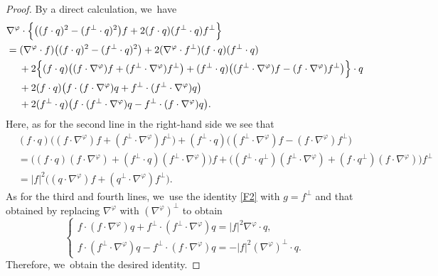 \begin{proof}
By a direct calculation, we~have
\begin{align*}
& \nabla^\varphi\cdot\Bigl\{ \bigl((f\cdot q)^2-(f^\perp\cdot q)^2 \bigr)f + 2(f\cdot q)(f^\perp\cdot q)f^\perp \Bigr\} \\
&= (\nabla^\varphi\cdot f)\bigl((f\cdot q)^2-(f^\perp\cdot q)^2 \bigr) + 2(\nabla^\varphi\cdot f^\perp)(f\cdot q)(f^\perp\cdot q) \\
&\quad\;
+ 2\Bigl\{ (f\cdot q)\bigl((f\cdot\nabla^\varphi)f + (f^\perp\cdot\nabla^\varphi)f^\perp \bigr)
+ (f^\perp\cdot q)\bigl((f^\perp\cdot\nabla^\varphi)f - (f\cdot\nabla^\varphi)f^\perp \bigr) \Bigr\}\cdot q \\
&\quad\;
+ 2(f\cdot q)\bigl(f\cdot(f\cdot\nabla^\varphi)q + f^\perp\cdot(f^\perp\cdot\nabla^\varphi)q \bigr)\\
&\quad\;
+ 2(f^\perp\cdot q)\bigl(f\cdot(f^\perp\cdot\nabla^\varphi)q - f^\perp\cdot(f\cdot\nabla^\varphi)q \bigr).
\end{align*}
Here, as for the second line in the right-hand side we see that
\begin{align*}
& (f\cdot q)\bigl((f\cdot\nabla^\varphi)f + (f^\perp\cdot\nabla^\varphi)f^\perp \bigr)
+ (f^\perp\cdot q)\bigl((f^\perp\cdot\nabla^\varphi)f - (f\cdot\nabla^\varphi)f^\perp \bigr) \\
&= \bigl((f\cdot q)(f\cdot\nabla^\varphi) + (f^\perp\!\cdot q)(f^\perp\cdot\nabla^\varphi) \bigr)f
+ \bigl((f^\perp\cdot q^\perp)(f^\perp\cdot\nabla^\varphi) + (f\cdot q^\perp)(f\cdot\nabla^\varphi) \bigr)f^\perp \\
&= |f|^2 \bigl((q\cdot\nabla^\varphi)f + (q^\perp\cdot\nabla^\varphi)f^\perp \bigr).
\end{align*}
As for the third and fourth lines, we~use the identity \eqref{F2} with $g=f^\perp$ and that obtained by replacing $\nabla^\varphi$ with $(\nabla^\varphi)^\perp$ to obtain
\[
\begin{cases}
f\cdot(f\cdot\nabla^\varphi)q + f^\perp\cdot(f^\perp\cdot\nabla^\varphi)q = |f|^2\nabla^\varphi\cdot q, \\
f\cdot(f^\perp\cdot\nabla^\varphi)q - f^\perp\cdot(f\cdot\nabla^\varphi)q = -|f|^2(\nabla^\varphi)^\perp\cdot q.
\end{cases}
\]
Therefore, we~obtain the desired identity.
\end{proof}

